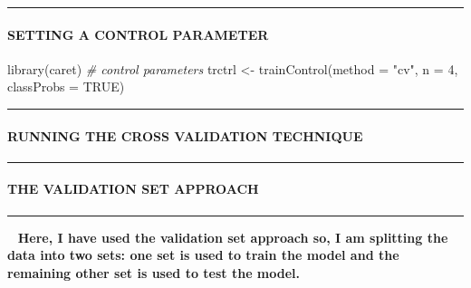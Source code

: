 \documentclass[
]{article}
\newenvironment{Shaded}{\begin{snugshade}}{\end{snugshade}}
\newcommand{\AttributeTok}[1]{\textcolor[rgb]{0.77,0.63,0.00}{#1}}
\newcommand{\CommentTok}[1]{\textcolor[rgb]{0.56,0.35,0.01}{\textit{#1}}}
\newcommand{\ConstantTok}[1]{\textcolor[rgb]{0.00,0.00,0.00}{#1}}
\newcommand{\DecValTok}[1]{\textcolor[rgb]{0.00,0.00,0.81}{#1}}
\newcommand{\FunctionTok}[1]{\textcolor[rgb]{0.00,0.00,0.00}{#1}}
\newcommand{\NormalTok}[1]{#1}
\newcommand{\OtherTok}[1]{\textcolor[rgb]{0.56,0.35,0.01}{#1}}
\newcommand{\StringTok}[1]{\textcolor[rgb]{0.31,0.60,0.02}{#1}}
\begin{document}
\begin{center}\rule{0.5\linewidth}{0.5pt}\end{center}

\hypertarget{setting-a-control-parameter}{%
\paragraph{\texorpdfstring{\textbf{SETTING A CONTROL
PARAMETER}}{SETTING A CONTROL PARAMETER}}\label{setting-a-control-parameter}}

\begin{Shaded}
\begin{Highlighting}[]
\FunctionTok{library}\NormalTok{(caret)}
\CommentTok{\# control parameters}
\NormalTok{trctrl }\OtherTok{\textless{}{-}} \FunctionTok{trainControl}\NormalTok{(}\AttributeTok{method =} \StringTok{"cv"}\NormalTok{, }\AttributeTok{n =} \DecValTok{4}\NormalTok{, }\AttributeTok{classProbs =} \ConstantTok{TRUE}\NormalTok{)}
\end{Highlighting}
\end{Shaded}

\begin{center}\rule{0.5\linewidth}{0.5pt}\end{center}

\hypertarget{running-the-cross-validation-technique}{%
\paragraph{\texorpdfstring{\textbf{RUNNING THE CROSS VALIDATION
TECHNIQUE}}{RUNNING THE CROSS VALIDATION TECHNIQUE}}\label{running-the-cross-validation-technique}}

\begin{center}\rule{0.5\linewidth}{0.5pt}\end{center}

\hypertarget{the-validation-set-approach}{%
\paragraph{\texorpdfstring{\textbf{THE VALIDATION SET
APPROACH}}{THE VALIDATION SET APPROACH}}\label{the-validation-set-approach}}

\begin{center}\rule{0.5\linewidth}{0.5pt}\end{center}

~ \textbf{Here, I have used the validation set approach so, I am
splitting the data into two sets: one set is used to train the model and
the remaining other set is used to test the model.}
\end{document}
